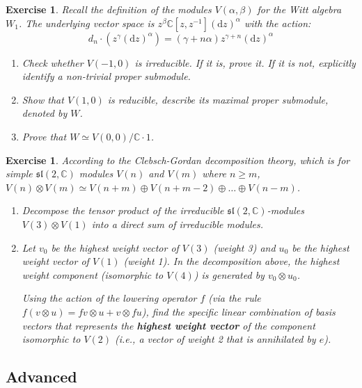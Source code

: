 \documentclass{article}
\newtheorem{exercise}[theorem]{Exercise}
\newcommand{\C}{\mathbb{C}}
\newcommand{\slC}{\mathfrak{sl}(2, \mathbb{C})}
\newcommand{\der}{\mathrm{d}}
\begin{document}
\begin{exercise}
Recall the definition of the modules $V(\alpha, \beta)$ for the Witt algebra $W_1$. The underlying vector space is $z^\beta \C[z, z^{-1}] (\der z)^\alpha$ with the action:
\[ d_n \cdot (z^{\gamma} (\der z)^\alpha) = (\gamma + n\alpha) z^{\gamma+n} (\der z)^\alpha \]
\begin{enumerate}
    \item Check whether $ V(-1,0) $ is irreducible. If it is, prove it. If it is not, explicitly identify a non-trivial proper submodule. 
    \item Show that $ V(1,0) $ is reducible, describe its maximal proper submodule, denoted by $ W $.
    \item Prove that $ W \simeq V(0,0)/\mathbb{C} \cdot 1 $.  
\end{enumerate}
\end{exercise}

\begin{exercise}
According to the Clebsch-Gordan decomposition theory, which is for simple $ \slC $ modules $ V(n) $ and $ V(m) $ where $ n \ge m $, $ V(n) \otimes V(m) \simeq  V(n+m) \oplus V(n+m-2) \oplus \ldots \oplus V(n-m) $.
\begin{enumerate}
    \item Decompose the tensor product of the irreducible $\slC$-modules $V(3) \otimes V(1)$ into a direct sum of irreducible modules.
    \item Let $v_0$ be the highest weight vector of $V(3)$ (weight 3) and $u_0$ be the highest weight vector of $V(1)$ (weight 1). In the decomposition above, the highest weight component (isomorphic to $V(4)$) is generated by $v_0 \otimes u_0$. 
    
    Using the action of the lowering operator $f$ (via the rule $f(v \otimes u) = fv \otimes u + v \otimes fu$), find the specific linear combination of basis vectors that represents the \textbf{highest weight vector} of the component isomorphic to $V(2)$ (i.e., a vector of weight 2 that is annihilated by $e$).
\end{enumerate}
\end{exercise}

\subsection*{Advanced}
\end{document}
